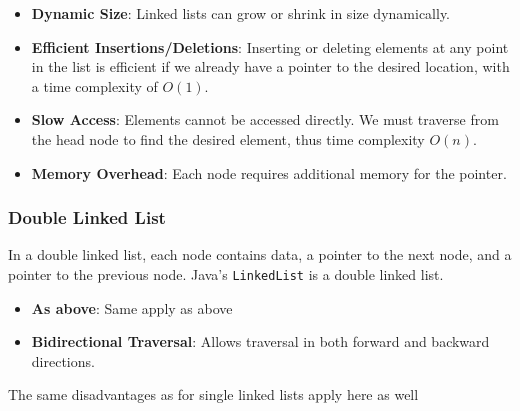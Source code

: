 \begin{itemize}
    \item \textbf{Dynamic Size}: Linked lists can grow or shrink in size dynamically.
    \item \textbf{Efficient Insertions/Deletions}: Inserting or deleting elements at any point in the list is efficient if we already have a pointer to the desired location, with a time complexity of \(O(1)\).
\end{itemize}

\begin{itemize}
    \item \textbf{Slow Access}: Elements cannot be accessed directly. We must traverse from the head node to find the desired element, thus time complexity \(O(n)\).
    \item \textbf{Memory Overhead}: Each node requires additional memory for the pointer.
\end{itemize}

\subsubsection{Double Linked List}
In a double linked list, each node contains data, a pointer to the next node, and a pointer to the previous node. Java's \texttt{LinkedList} is a double linked list.

\begin{itemize}
    \item \textbf{As above}: Same apply as above
    \item \textbf{Bidirectional Traversal}: Allows traversal in both forward and backward directions.
\end{itemize}

The same disadvantages as for single linked lists apply here as well

\newpage
